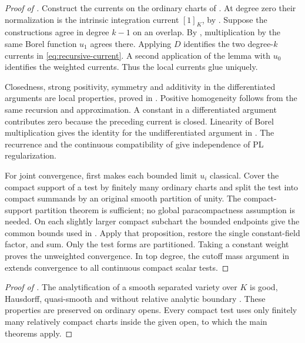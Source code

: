 \documentclass[11pt,reqno]{amsart}
\theoremstyle{definition}
\theoremstyle{remark}
\numberwithin{equation}{section}
\begin{document}
\label{proof:main-currents}
\begin{proof}[Proof of ]
Construct the currents on the ordinary charts of
. At degree zero their
normalization is the intrinsic integration current \([1]_K\),
by . Suppose the constructions
agree in degree \(k-1\) on an overlap. By
, multiplication by the same Borel
function \(u_1\) agrees there. Applying \(D\) identifies
the two degree-\(k\) currents in
\eqref{eq:recursive-current}. A second application of the
lemma with \(u_0\) identifies the weighted currents.
Thus the local currents glue uniquely.

Closedness, strong positivity, symmetry and additivity in the
differentiated arguments are local properties, proved in
. Positive homogeneity follows
from the same recursion and approximation. A constant in a
differentiated argument contributes zero because the preceding
current is closed. Linearity of Borel multiplication
gives the identity for the undifferentiated argument in .
The recurrence and the continuous compatibility of
 give independence of PL
regularization.

For joint convergence,  first
makes each bounded limit \(u_i\) classical. Cover the compact
support of a test by finitely many ordinary charts and split
the test into compact summands by an original smooth
partition of unity. The compact-support partition theorem
\cite[Corollary~15.2.9]{CLD25} is sufficient; no global
paracompactness assumption is needed. On each slightly larger
compact subchart the bounded endpoints give the common bounds
used in . Apply that proposition,
restore the single constant-field factor, and sum.
Only the test forms are partitioned.
Taking a constant weight proves the unweighted convergence.
In top degree, the cutoff mass argument in
 extends convergence to all continuous
compact scalar tests.
\end{proof}

\begin{proof}[Proof of ]
The analytification of a smooth separated variety over \(K\)
is good, Hausdorff, quasi-smooth and without relative analytic
boundary \cite[Exercise~5.1.1(iii), Fact~5.1.5]{Tem}.
These properties are preserved on ordinary opens.
Every compact test uses only finitely many relatively compact
charts inside the given open, to which the main theorems apply.
\end{proof}
\end{document}
